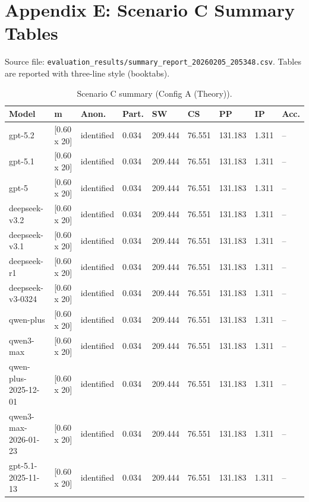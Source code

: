 \section{Appendix E: Scenario C Summary Tables}
\label{app:scenario_c_summary_tables}

Source file: \texttt{evaluation\_results/summary\_report\_20260205\_205348.csv}.
Tables are reported with three-line style (booktabs).

\begin{table}[t]
  \centering
  \caption{Scenario C summary (Config A (Theory)).}
  \label{tab:app_sc_c_A_Theory}
  \small
  \setlength{\tabcolsep}{4pt}
  \renewcommand{\arraystretch}{1.05}
  \begin{tabular}{p{3.2cm} p{1.6cm} p{1.4cm} p{1.2cm} p{1.25cm} p{1.25cm} p{1.25cm} p{1.25cm} p{1.05cm}}
    \toprule
    Model & m & Anon. & Part. & SW & CS & PP & IP & Acc. \\
    \midrule
    gpt-5.2 & [0.60 x 20] & identified & 0.034 & 209.444 & 76.551 & 131.183 & 1.311 & -- \\
    gpt-5.1 & [0.60 x 20] & identified & 0.034 & 209.444 & 76.551 & 131.183 & 1.311 & -- \\
    gpt-5 & [0.60 x 20] & identified & 0.034 & 209.444 & 76.551 & 131.183 & 1.311 & -- \\
    deepseek-v3.2 & [0.60 x 20] & identified & 0.034 & 209.444 & 76.551 & 131.183 & 1.311 & -- \\
    deepseek-v3.1 & [0.60 x 20] & identified & 0.034 & 209.444 & 76.551 & 131.183 & 1.311 & -- \\
    deepseek-r1 & [0.60 x 20] & identified & 0.034 & 209.444 & 76.551 & 131.183 & 1.311 & -- \\
    deepseek-v3-0324 & [0.60 x 20] & identified & 0.034 & 209.444 & 76.551 & 131.183 & 1.311 & -- \\
    qwen-plus & [0.60 x 20] & identified & 0.034 & 209.444 & 76.551 & 131.183 & 1.311 & -- \\
    qwen3-max & [0.60 x 20] & identified & 0.034 & 209.444 & 76.551 & 131.183 & 1.311 & -- \\
    qwen-plus-2025-12-01 & [0.60 x 20] & identified & 0.034 & 209.444 & 76.551 & 131.183 & 1.311 & -- \\
    qwen3-max-2026-01-23 & [0.60 x 20] & identified & 0.034 & 209.444 & 76.551 & 131.183 & 1.311 & -- \\
    gpt-5.1-2025-11-13 & [0.60 x 20] & identified & 0.034 & 209.444 & 76.551 & 131.183 & 1.311 & -- \\
    \bottomrule
  \end{tabular}
\end{table}

